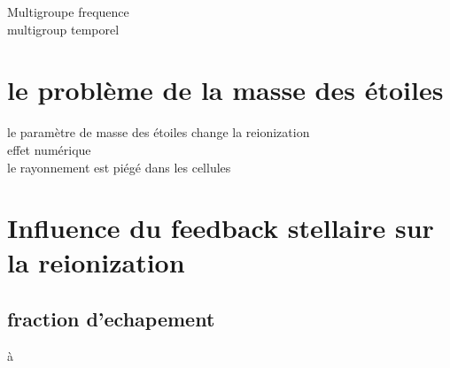 Multigroupe frequence\\
multigroup temporel\\


\section{le problème de la masse des étoiles}

le paramètre de masse des étoiles change la reionization\\
effet numérique\\
le rayonnement est piégé dans les cellules\\






\section{Influence du feedback stellaire sur la reionization}




\subsection{fraction d'echapement}à

